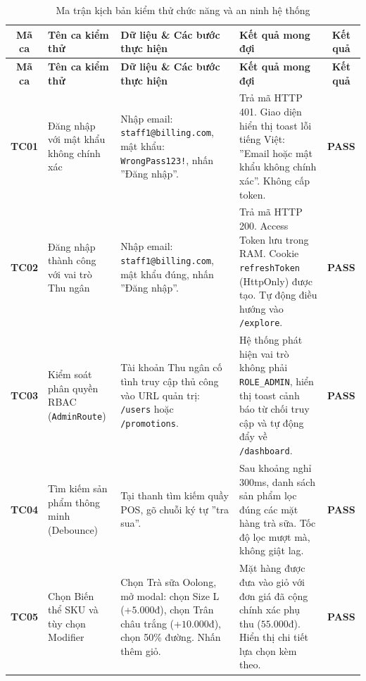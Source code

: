 \begin{longtable}{|c|p{3.2cm}|p{3.8cm}|p{4.2cm}|c|}
\caption{Ma trận kịch bản kiểm thử chức năng và an ninh hệ thống} \label{tab:test_cases_matrix} \\
\hline
\textbf{Mã ca} & \textbf{Tên ca kiểm thử} & \textbf{Dữ liệu \& Các bước thực hiện} & \textbf{Kết quả mong đợi} & \textbf{Kết quả} \\ \hline
\endfirsthead
\hline
\textbf{Mã ca} & \textbf{Tên ca kiểm thử} & \textbf{Dữ liệu \& Các bước thực hiện} & \textbf{Kết quả mong đợi} & \textbf{Kết quả} \\ \hline
\endhead
\hline
\endfoot
\hline
\endlastfoot

\textbf{TC01} & Đăng nhập với mật khẩu không chính xác & Nhập email: \texttt{staff1@billing.com}, mật khẩu: \texttt{WrongPass123!}, nhấn ''Đăng nhập''. & Trả mã HTTP 401. Giao diện hiển thị toast lỗi tiếng Việt: ''Email hoặc mật khẩu không chính xác''. Không cấp token. & \textbf{PASS} \\ \hline

\textbf{TC02} & Đăng nhập thành công với vai trò Thu ngân & Nhập email: \texttt{staff1@billing.com}, mật khẩu đúng, nhấn ''Đăng nhập''. & Trả mã HTTP 200. Access Token lưu trong RAM. Cookie \texttt{refreshToken} (HttpOnly) được tạo. Tự động điều hướng vào \texttt{/explore}. & \textbf{PASS} \\ \hline

\textbf{TC03} & Kiểm soát phân quyền RBAC (\texttt{AdminRoute}) & Tài khoản Thu ngân cố tình truy cập thủ công vào URL quản trị: \texttt{/users} hoặc \texttt{/promotions}. & Hệ thống phát hiện vai trò không phải \texttt{ROLE\_ADMIN}, hiển thị toast cảnh báo từ chối truy cập và tự động đẩy về \texttt{/dashboard}. & \textbf{PASS} \\ \hline

\textbf{TC04} & Tìm kiếm sản phẩm thông minh (Debounce) & Tại thanh tìm kiếm quầy POS, gõ chuỗi ký tự ''tra sua''. & Sau khoảng nghỉ $300$ms, danh sách sản phẩm lọc đúng các mặt hàng trà sữa. Tốc độ lọc mượt mà, không giật lag. & \textbf{PASS} \\ \hline

\textbf{TC05} & Chọn Biến thể SKU và tùy chọn Modifier & Chọn Trà sữa Oolong, mở modal: chọn Size L (+$5.000$đ), chọn Trân châu trắng (+$10.000$đ), chọn 50\% đường. Nhấn thêm giỏ. & Mặt hàng được đưa vào giỏ với đơn giá đã cộng chính xác phụ thu ($55.000$đ). Hiển thị chi tiết lựa chọn kèm theo. & \textbf{PASS} \\ \hline


\end{longtable}
